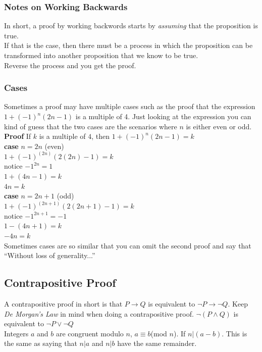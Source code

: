 \documentclass[a4paper,11pt]{article}
\begin{document}
\subsubsection{Notes on Working Backwards}
In short, a proof by working backwords starts by \textit{assuming} that the proposition is true.\\ If that is the case, then there must be a process in which the proposition can be transformed into another proposition that we know to be true.\\
Reverse the process and you get the proof.
\subsubsection{Cases}
Sometimes a proof may have multiple cases such as the proof that the  expression $1+(-1)^n(2n-1)$ is a multiple of 4. Just looking at the expression you can kind of guess that the two cases are the scenarios where $n$ is either even or odd.\vspace{5pt}\\
\textbf{Proof} If $k$ is a multiple of $4$, then $1+(-1)^n(2n-1)=k$\vspace{5pt}\\
\textbf{case} $n=2n$ (even)\\
$1+(-1)^{(2n)}(2(2n)-1)=k$\\
notice $-1^{2n} = 1$\\
$1+(4n-1)=k$\\
$4n=k$
\vspace{5pt}\\
\textbf{case} $n=2n+1$ (odd)\\
$1+(-1)^{(2n+1)}(2(2n+1)-1)=k$\\
notice $-1^{2n+1} = -1$\\
$1-(4n+1)=k$\\
$-4n=k$\vspace{5pt}\\
Sometimes cases are so similar that you can omit the second proof and say that ``Without loss of generality...''
\subsection{Contrapositive Proof}
A contrapositive proof in short is that $P \rightarrow Q$ is equivalent to $\neg P \rightarrow \neg Q$. Keep \textit{De Morgan's Law} in mind when doing a contrapositive proof. $\neg (P \wedge Q)$ is equivalent to $\neg P \vee \neg Q$\bigskip\\
Integers $a$ and $b$ are congruent modulo $n$, $a \equiv b$(mod $n$). If $n | (a-b)$. This is the same as saying that $n | a$ and $n | b$ have the same remainder.
\end{document}
